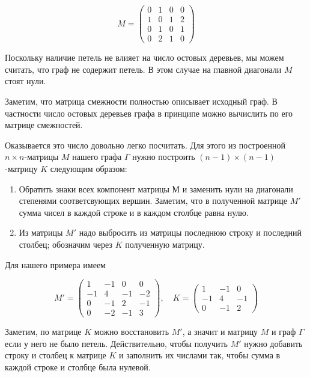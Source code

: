 \documentclass{article}
\begin{document}
\[M=\left(
\begin{matrix}
0&1&0&0
\\
1&0&1&2
\\
0&1&0&1
\\
0&2&1&0
\end{matrix}
\right)\]

Поскольку наличие петель не влияет на число остовых деревьев, мы можем считать, что граф не содержит петель.
В этом случае на главной диагонали $M$ стоят нули.

Заметим, что матрица смежности полностью описывает исходный граф. 
В частности число остовых деревьев графа в принципе можно вычислить по его матрице смежностей.

Оказывается это число довольно легко посчитать.
Для этого из построенной $n\times n$-матрицы  $M$ нашего графа $\Gamma$ нужно построить $(n-1)\times(n-1)$-матрицу $K$ следующим образом: 

\begin{enumerate}
\item Обратить знаки всех компонент матрицы $М$ и заменить нули на диагонали степенями соответсвующих вершин. Заметим, что в полученной матрице $M'$ сумма чисел в каждой строке и в каждом столбце равна нулю. 
\item Из матрицы $M'$ надо выбросить из матрицы последнюю строку и последний столбец;
обозначим через $K$ полученную матрицу.
\end{enumerate}

Для нашего примера имеем

\[M'=\left(
\begin{matrix}
1&-1&0&0
\\
-1&4&-1&-2
\\
0&-1&2&-1
\\
0&-2&-1&3
\end{matrix}\right),
\quad 
K=\left(
\begin{matrix}
1&-1&0
\\
-1&4&-1
\\
0&-1&2
\end{matrix}
\right)\]

Заметим, по матрице $K$ можно восстановить $M'$, а значит и матрицу $M$ и граф $\Gamma$ если у него не было петель.
Действительно, чтобы получить $M'$ нужно добавить строку и столбец к матрице $K$ и заполнить их числами так, чтобы сумма в каждой строке и столбце была нулевой.
\end{document}
